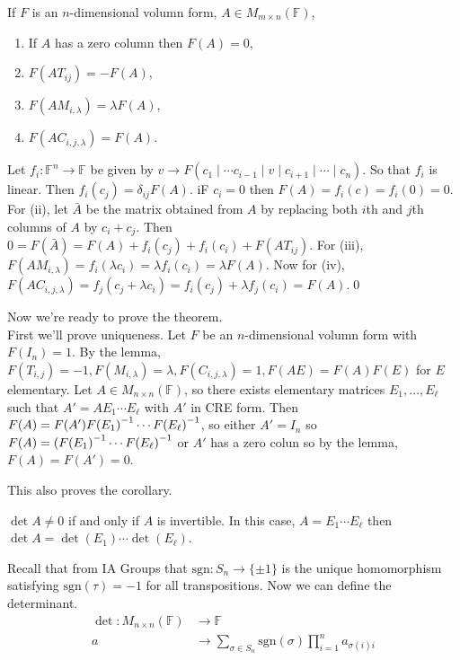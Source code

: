 \documentclass{article}
\newcommand{\F}{\mathbb{F}}
\newcommand{\sgn}{\mathrm{sgn}}
\begin{document}
\begin{lemma}
	If $ F $ is an $ n $-dimensional volumn form, $ A\in M_{m\times n}(\F) $,
	\begin{enumerate}
		\item If $ A $ has a zero column then $ F(A)=0 $,
		\item $ F(AT_{ij})=-F(A) $,
		\item $ F(AM_{i,\lambda})=\lambda F(A) $,
		\item $ F(AC_{i,j,\lambda})=F(A) $.
	\end{enumerate}
\end{lemma}
\pf Let $ f_i:\F^n \to \F $ be given by $ v\to F(c_1\mid \cdots c_{i-1} \mid v\mid c_{i+1}\mid \cdots \mid c_n) $. So that $ f_i $ is linear. Then $ f_i(c_j)=\delta_{ij}F(A) $. iF $ c_i=0 $ then $ F(A)=f_i(c)=f_i(0)=0 $. For (ii), let $ \bar A $ be the matrix obtained from $ A $ by replacing both $ i $th and $ j $th columns of $ A $ by $ c_i+c_j $. Then $ 0=F(\bar A)=F(A)+f_i(c_j)+f_i(c_i)+F(AT_{ij}) $. For (iii), $ F(AM_{i,\lambda})=f_i(\lambda c_i)=\lambda f_i(c_i)=\lambda F(A) $. Now for (iv), $ F(AC_{i,j,\lambda})=f_j(c_j+\lambda c_i)=f_i(c_j)+\lambda f_j(c_i)=F(A) $.\qed\par
Now we're ready to prove the theorem.\\
\pf First we'll prove uniqueness. Let $ F $ be an $ n $-dimensional volumn form with $ F(I_n)=1 $. By the lemma, $ F(T_{i,j})=-1, F(M_{i,\lambda})=\lambda, F(C_{i,j,\lambda})=1, F(AE)=F(A)F(E) $ for $ E $ elementary. Let $ A\in M_{n\times n}(\F) $, so there exists elementary matrices $ E_1,\dots, E_\ell $ such that $ A'=AE_1\cdots E_\ell $ with $ A' $ in CRE form. Then $ F(A)=F(A'){F(E_1)}^{-1}\cdots {F(E_\ell)}^{-1} $, so either $ A'=I_n $ so $ F(A)={(F(E_1)}^{-1}\cdots {F(E_\ell)}^{-1} $ or $ A' $ has a zero colun so by the lemma, $ F(A)=F(A')=0 $.\par
This also proves the corollary.
\begin{corollary}
  $ \det A\ne 0 $ if and only if $ A $ is invertible. In this case, $ A=E_1\cdots E_\ell $ then $ \det A=\det(E_1)\cdots \det(E_\ell) $.
\end{corollary}
Recall that from IA Groups that $ \sgn:S_n\to \{\pm 1 \} $ is the unique homomorphism satisfying $ \sgn(\tau)=-1 $ for all transpositions. Now we can define the determinant.
\begin{align*}
	\det:M_{n\times n}(\F)&\to \F \\
	a&\to \sum_{\sigma\in S_n}\sgn(\sigma)\prod_{i=1}^na_{\sigma(i)i}
\end{align*}
\end{document}
